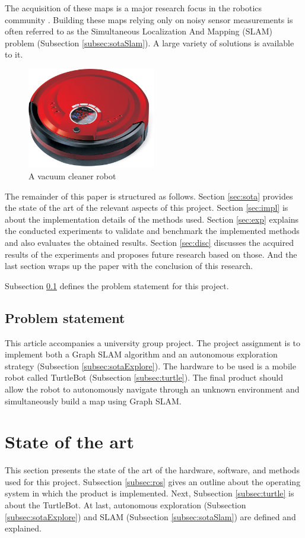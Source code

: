 \documentclass{ba-kecs}
\begin{document}
The acquisition of these maps is a major research focus in the robotics community \citep{Grisetti, Montemerlo02, Montemerlo, Thrun}. Building these maps relying only on noisy sensor measurements is often referred to as the Simultaneous Localization And Mapping (SLAM) problem (Subsection \ref{subsec:sotaSlam}). A large variety of solutions is available to it.
\begin{figure}[h]
	\centering
		\includegraphics[width=0.50\textwidth]{figures/vacuum_cleaner.jpg}
	\caption{A vacuum cleaner robot \citep{VacuumRobot}}
	\label{fig:vacuum_cleaner}
\end{figure}

The remainder of this paper is structured as follows. Section \ref{sec:sota} provides the state of the art of the relevant aspects of this project. Section \ref{sec:impl} is about the implementation details of the methods used. Section \ref{sec:exp} explains the conducted experiments to validate and benchmark the implemented methods and also evaluates the obtained results. Section \ref{sec:disc} discusses the acquired results of the experiments and proposes future research based on those. And the last section wraps up the paper with the conclusion of this research.

Subsection \ref{sec:problem} defines the problem statement for this project.
\subsection{Problem statement}
\label{sec:problem}
This article accompanies a university group project. The project assignment is to implement both a Graph SLAM algorithm and an autonomous exploration strategy (Subsection \ref{subsec:sotaExplore}). The hardware to be used is a mobile robot called TurtleBot (Subsection \ref{subsec:turtle}). The final product should allow the robot to autonomously navigate through an unknown environment and simultaneously build a map using Graph SLAM.

\section{State of the art}
This section presents the state of the art of the hardware, software, and methods used for this project. Subsection \ref{subsec:ros} gives an outline about the operating system in which the product is implemented. Next, Subsection \ref{subsec:turtle} is about the TurtleBot. At last, autonomous exploration (Subsection \ref{subsec:sotaExplore}) and SLAM (Subsection \ref{subsec:sotaSlam}) 
\label{sec:sota} are defined and explained.
\end{document}
